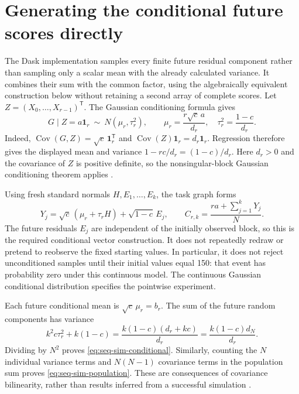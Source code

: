 \section{Generating the conditional future scores directly}
The Dask implementation samples every finite future residual component
rather than sampling only a scalar mean with the already calculated
variance. It combines their sum with the common factor, using the
algebraically equivalent construction below without retaining a second
array of complete scores.
Let \(Z=(X_0,\ldots,X_{r-1})^{\mathsf T}\). The Gaussian conditioning
formula gives
\begin{equation}
 G\mid Z=a\mathbf1_r\ \sim\ N(\mu_r,\tau_r^2),
 \qquad \mu_r=\frac{r\sqrt c\,a}{d_r},\quad
 \tau_r^2=\frac{1-c}{d_r}.
 \label{eq:seq-sim-posterior-factor}
\end{equation}
Indeed, \(\operatorname{Cov}(G,Z)=\sqrt c\,\mathbf1_r^{\mathsf T}\)
and \(\operatorname{Cov}(Z)\mathbf1_r=d_r\mathbf1_r\). Regression
therefore gives the displayed mean and variance
\(1-rc/d_r=(1-c)/d_r\). Here \(d_r>0\) and the covariance of \(Z\)
is positive definite, so the nonsingular-block Gaussian conditioning
theorem applies \citep[Theorems 3.5.1--3.5.2]{gallager2013}.

Using fresh standard normals \(H,E_1,\ldots,E_k\), the task graph forms
\begin{equation}
 Y_j=\sqrt c\,(\mu_r+\tau_r H)+\sqrt{1-c}\,E_j,
 \qquad
 C_{r,k}=\frac{ra+\sum_{j=1}^{k}Y_j}{N}.
 \label{eq:seq-sim-future-vector}
\end{equation}
The future residuals \(E_j\) are independent of the initially observed
block, so this is the required conditional vector construction. It does
not repeatedly redraw or pretend to reobserve the fixed starting values.
In particular, it does not reject unconditioned samples until their
initial values equal 150: that event has probability zero under this
continuous model. The continuous Gaussian conditional distribution
specifies the pointwise experiment.

Each future conditional mean is \(\sqrt c\,\mu_r=b_r\). The sum of the
future random components has variance
\[
 k^2c\tau_r^2+k(1-c)
 =\frac{k(1-c)(d_r+kc)}{d_r}
 =\frac{k(1-c)d_N}{d_r}.
\]
Dividing by \(N^2\) proves \eqref{eq:seq-sim-conditional}. Similarly,
counting the \(N\) individual variance terms and \(N(N-1)\)
covariance terms in the population sum proves
\eqref{eq:seq-sim-population}. These are consequences of covariance
bilinearity, rather than results inferred from a successful simulation
\citep[Theorem 1.6.1 and Section 2.2]{durrett2019}.

